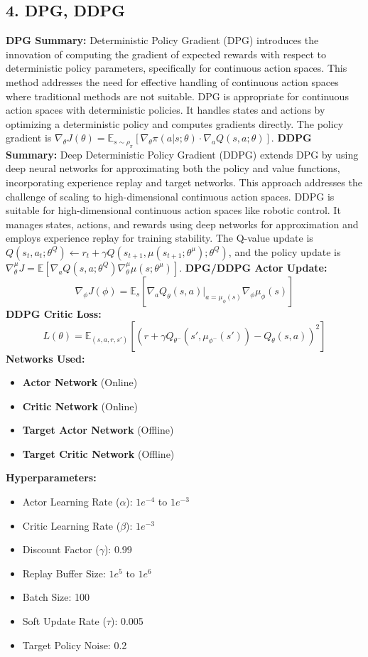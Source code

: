 \documentclass[a4paper,10pt]{article}
\begin{document}
\begin{multicols}{2}
\section*{4. DPG, DDPG}
\textbf{DPG Summary:} Deterministic Policy Gradient (DPG) introduces the innovation of computing the gradient of expected rewards with respect to deterministic policy parameters, specifically for continuous action spaces. This method addresses the need for effective handling of continuous action spaces where traditional methods are not suitable. DPG is appropriate for continuous action spaces with deterministic policies. It handles states and actions by optimizing a deterministic policy and computes gradients directly. The policy gradient is \( \nabla_\theta J(\theta) = \mathbb{E}_{s \sim \rho_\pi} \left[ \nabla_\theta \pi(a|s; \theta) \cdot \nabla_a Q(s, a; \theta) \right] \).
\textbf{DDPG Summary:} Deep Deterministic Policy Gradient (DDPG) extends DPG by using deep neural networks for approximating both the policy and value functions, incorporating experience replay and target networks. This approach addresses the challenge of scaling to high-dimensional continuous action spaces. DDPG is suitable for high-dimensional continuous action spaces like robotic control. It manages states, actions, and rewards using deep networks for approximation and employs experience replay for training stability. The Q-value update is \( Q(s_t, a_t; \theta^Q) \leftarrow r_t + \gamma Q(s_{t+1}, \mu(s_{t+1}; \theta^\mu); \theta^Q) \), and the policy update is \( \nabla_\theta^\mu J = \mathbb{E} \left[ \nabla_a Q(s, a; \theta^Q) \nabla_\theta^\mu \mu(s; \theta^\mu) \right] \).
\textbf{DPG/DDPG Actor Update:}
\[
\nabla_\phi J(\phi) = \mathbb{E}_s \left[ \nabla_a Q_\theta(s, a) \big|_{a=\mu_\phi(s)} \nabla_\phi \mu_\phi(s) \right]
\]
\textbf{DDPG Critic Loss:}
\[
L(\theta) = \mathbb{E}_{(s, a, r, s')} \left[ \left( r + \gamma Q_{\theta^-}(s', \mu_{\phi^-}(s')) - Q_\theta(s, a) \right)^2 \right]
\]
\textbf{Networks Used:}
\begin{itemize}
    \item \textbf{Actor Network} (Online)
    \item \textbf{Critic Network} (Online)
    \item \textbf{Target Actor Network} (Offline)
    \item \textbf{Target Critic Network} (Offline)
\end{itemize}
\textbf{Hyperparameters:}
\begin{itemize}
    \item Actor Learning Rate (\(\alpha\)): \(1e^{-4}\) to \(1e^{-3}\)
    \item Critic Learning Rate (\(\beta\)): \(1e^{-3}\)
    \item Discount Factor (\(\gamma\)): 0.99
    \item Replay Buffer Size: \(1e^5\) to \(1e^6\)
    \item Batch Size: 100
    \item Soft Update Rate (\(\tau\)): 0.005
    \item Target Policy Noise: 0.2
\end{itemize}


\end{multicols}
\end{document}
